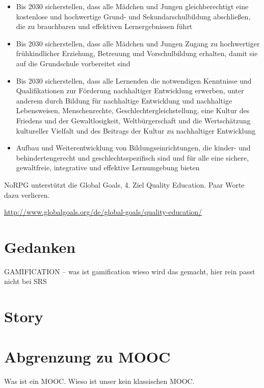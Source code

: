 \begin{itemize}
\item Bis 2030 sicherstellen, dass alle Mädchen und Jungen gleichberechtigt eine kostenlose und hochwertige Grund- und Sekundarschulbildung abschließen, die zu brauchbaren und effektiven Lernergebnissen führt
\item Bis 2030 sicherstellen, dass alle Mädchen und Jungen Zugang zu hochwertiger frühkindlicher Erziehung, Betreuung und Vorschulbildung erhalten, damit sie auf die Grundschule vorbereitet sind
\item Bis 2030 sicherstellen, dass alle Lernenden die notwendigen Kenntnisse und Qualifikationen zur Förderung nachhaltiger Entwicklung erwerben, unter anderem durch Bildung für nachhaltige Entwicklung und nachhaltige Lebensweisen, Menschenrechte, Geschlechtergleichstellung, eine Kultur des Friedens und der Gewaltlosigkeit, Weltbürgerschaft und die Wertschätzung kultureller Vielfalt und des Beitrags der Kultur zu nachhaltiger Entwicklung
\item Aufbau und Weiterentwicklung von Bildungseinrichtungen, die kinder- und behindertengerecht und geschlechtsspezifisch sind und für alle eine sichere, gewaltfreie, integrative und effektive Lernumgebung bieten
\end{itemize}



	
	NoRPG unterstützt die Global Goals, 4. Ziel Quality Education. Paar Worte dazu verlieren. 
	
	\url{http://www.globalgoals.org/de/global-goals/quality-education/}

	
\section{Gedanken}
	
	GAMIFICATION -- was ist gamification wieso wird das gemacht, hier rein passt nicht bei SRS
	
\section{Story}
	
\section{Abgrenzung zu MOOC}
	Was ist ein MOOC. Wieso ist unser kein klassischen MOOC.